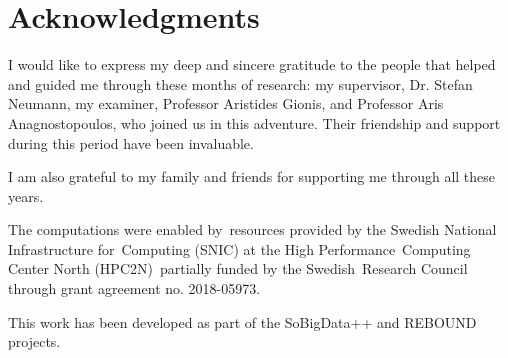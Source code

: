 \section*{Acknowledgments }

I would like to express my deep and sincere gratitude to the people that helped and
guided me through these months of research: my supervisor, Dr. Stefan Neumann,
my examiner, Professor
Aristides Gionis, and Professor Aris Anagnostopoulos, who joined
us in this adventure. Their friendship and support during this period have been
invaluable.

I am also grateful to my family and friends for supporting me through
all these years.

\bigskip
The computations were enabled by resources provided by the Swedish National Infrastructure for Computing
(SNIC) at the High Performance Computing Center North (HPC2N) partially funded by the Swedish Research Council through grant agreement no. 2018-05973.

This work has been developed as part of the SoBigData++ and REBOUND projects.
\acknowlegmentssignature
